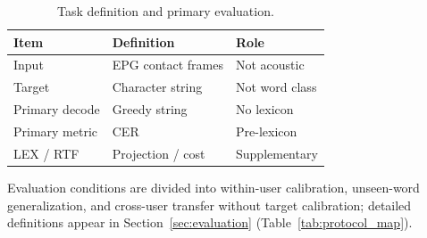 \begin{table}[t]
\centering
\caption{Task definition and primary evaluation.}
\label{tab:task_definition}
\setlength{\tabcolsep}{1.5pt}
\begin{tabular}{@{}p{}p{}p{}@{}}
\toprule
Item & Definition & Role \\
\midrule
Input & EPG contact frames & Not acoustic \\
Target & Character string & Not word class \\
Primary decode & Greedy string & No lexicon \\
Primary metric & CER & Pre-lexicon \\
LEX / RTF & Projection / cost & Supplementary \\
\bottomrule
\end{tabular}
\end{table}

Evaluation conditions are divided into within-user calibration, unseen-word generalization, and cross-user transfer without target calibration; detailed definitions appear in Section~\ref{sec:evaluation} (Table~\ref{tab:protocol_map}).
